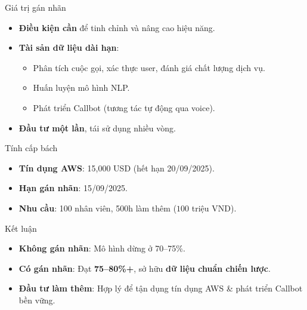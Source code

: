 \documentclass{beamer}
\begin{document}
\begin{frame}{Giá trị gán nhãn}
    \begin{itemize}
        \item \textbf{Điều kiện cần} để tinh chỉnh và nâng cao hiệu năng.
        \item \textbf{Tài sản dữ liệu dài hạn}:
            \begin{itemize}
                \item Phân tích cuộc gọi, xác thực user, đánh giá chất lượng dịch vụ.
                \item Huấn luyện mô hình NLP.
                \item Phát triển Callbot (tương tác tự động qua voice).
            \end{itemize}
        \item \textbf{Đầu tư một lần}, tái sử dụng nhiều vòng.
    \end{itemize}
\end{frame}

\begin{frame}{Tính cấp bách}
    \begin{itemize}
        \item \textbf{Tín dụng AWS}: 15,000 USD (hết hạn 20/09/2025).
        \item \textbf{Hạn gán nhãn}: 15/09/2025.
        \item \textbf{Nhu cầu}: 100 nhân viên, 500h làm thêm ($ 100$ triệu VND).
    \end{itemize}
\end{frame}

\begin{frame}{Kết luận}
    \begin{itemize}
        \item \textbf{Không gán nhãn}: Mô hình dừng ở 70--75\%.
        \item \textbf{Có gán nhãn}: Đạt \textbf{75--80\%+}, sở hữu \textbf{dữ liệu chuẩn chiến lược}.
        \item \textbf{Đầu tư làm thêm}: Hợp lý để tận dụng tín dụng AWS \& phát triển Callbot bền vững.
    \end{itemize}
\end{frame}

\end{document}
